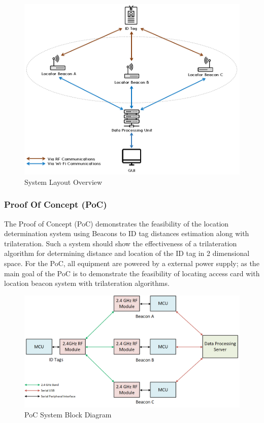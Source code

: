 \begin{figure}[h!]
    \centering
    \includegraphics[width=\linewidth]{./images/00_sys_arch.png}
    \caption{System Layout Overview}
    \label{fig:system_layout}
\end{figure}


\break
\subsubsection{Proof Of Concept (PoC)}

\bigskip
The Proof of Concept (\Gls{PoC}) demonstrates the feasibility of the location determination system using Beacons to ID tag distances estimation along with trilateration. Such a system should show the effectiveness of a trilateration algorithm for determining distance and location of the ID tag in 2 dimensional space. For the PoC, all equipment are powered by a external power supply; as the main goal of the PoC is to demonstrate the feasibility of locating access card with location beacon system with trilateration algorithms.

\begin{figure}[h!]
    \centering
    \includegraphics[width=\linewidth]{./images/01_sys_PoC.png}
    \caption{PoC System Block Diagram}
    \label{fig:PoC_sys_blk}
\end{figure}
\bigskip

